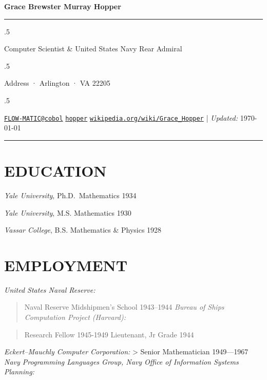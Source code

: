 \documentclass[10pt,]{article}
\begin{document}
\centerline{\huge \bf Grace Brewster Murray Hopper}

\vspace{2 mm}

\hrule

\vspace{2 mm}

\moveleft.5\hoffset\centerline{Computer Scientist \& United States Navy Rear Admiral}
\moveleft.5\hoffset\centerline{Address · Arlington · VA 22205}
\moveleft.5\hoffset\centerline{ \faEnvelopeO \hspace{1 mm} \href{mailto:}{\tt \href{mailto:FLOW-MATIC@cobol}{\nolinkurl{FLOW-MATIC@cobol}}} \hspace{1 mm}  \faGithub \hspace{1 mm} \href{http://github.com/hopper}{\tt hopper} \hspace{1 mm}    \faGlobe \hspace{1 mm} \href{http://wikipedia.org/wiki/Grace\_Hopper}{\tt wikipedia.org/wiki/Grace\_Hopper}    | \emph{Updated:} \today}

\vspace{2 mm}

\hrule


\section{EDUCATION}\label{education}

\emph{Yale University}, Ph.D.~Mathematics \hfill 1934

\emph{Yale University}, M.S. Mathematics \hfill 1930

\emph{Vassar College}, B.S. Mathematics \& Physics \hfill 1928

\section{EMPLOYMENT}\label{employment}

\emph{United States Naval Reserve:}

\begin{quote}
Naval Reserve Midshipmen's School \hfill 1943--1944 \emph{Bureau of
Ships Computation Project (Harvard):}
\end{quote}

\begin{quote}
Research Fellow \hfill 1945-1949 Lieutenant, Jr Grade \hfill 1944
\end{quote}

\emph{Eckert--Mauchly Computer Corporation:} \textgreater{} Senior
Mathematician \hfill 1949---1967 \emph{Navy Programming Languages Group,
Navy Office of Information Systems Planning:}
\end{document}
